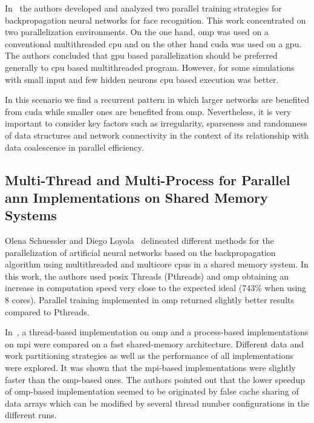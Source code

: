 \documentclass[10pt,journal,compsoc]{IEEEtran}
\begin{document}
In~\cite{HUQQANI2013349} the authors developed and analyzed two parallel training strategies for backpropagation neural networks for face recognition. This work concentrated on two parallelization environments. On the one hand, \gls{omp} was used on a conventional multithreaded \gls{cpu} and on the other hand \gls{cuda} was used on a \gls{gpu}. The authors concluded that \gls{gpu} based parallelization should be preferred generally to \gls{cpu} based multithreaded program. However, for some simulations with small input and few hidden neurons \gls{cpu} based execution was better.

In this scenario we find a recurrent pattern in which larger networks are benefited from \gls{cuda} while smaller ones are benefited from \gls{omp}. Nevertheless, it is very important to consider key factors such as irregularity, sparseness and randomness of data structures and network connectivity in the context of its relationship with data coalescence in parallel efficiency.











\subsection{Multi-Thread and Multi-Process for Parallel \gls{ann} Implementations on Shared Memory Systems}

Olena Schuessler and Diego Loyola~\cite{Schuessler:2011:PTA:1997052.1997062} delineated different methods for the parallelization of artificial neural networks based on the backpropagation algorithm using multithreaded and multicore \glspl{cpu} in a shared memory system. In this work, the authors used \gls{posix} Threads (Pthreads) and \gls{omp} obtaining an increase in computation speed very close to the expected ideal (743\% when using 8 cores). Parallel training implemented in \gls{omp} returned slightly better results compared to Pthreads.

In~\cite{Strey2003ACO}, a thread-based implementation on \gls{omp} and a process-based implementations on \gls{mpi} were compared on a fast shared-memory architecture. Different data and work partitioning strategies as well as the performance of all implementations were explored. It was shown that the \gls{mpi}-based implementations were slightly faster than the \gls{omp}-based ones. The authors pointed out that the lower speedup of \gls{omp}-based implementation seemed to be originated by false cache sharing of data arrays which can be modified by several thread number configurations in the different runs.
\end{document}

